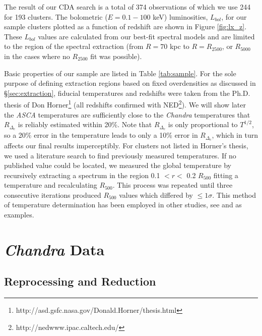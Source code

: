 \documentclass{emulateapj}
\begin{document}
The result of our CDA search is a total of 374 observations of which
we use 244 for 193 clusters. The bolometric ($E = 0.1-100$ keV)
luminosities, $L_{bol}$, for our sample clusters plotted as a function of
redshift are shown in Figure \ref{fig:lx_z}. These $L_{bol}$ values
are calculated from our best-fit spectral models and are limited to
the region of the spectral extraction (from $R=70$ kpc to
$R=R_{2500}$, or $R_{5000}$ in the cases where no $R_{2500}$ fit was
possible).

Basic properties of our sample are listed in Table
\ref{tab:sample}. For the sole purpose of defining extraction regions
based on fixed overdensities as discussed in \S\ref{sec:extraction},
fiducial temperatures and redshifts were taken from the Ph.D. thesis
of Don
Horner\footnote{http://asd.gsfc.nasa.gov/Donald.Horner/thesis.html}
(all redshifts confirmed with NED\footnote{http://nedwww.ipac.caltech.edu/}).
We will show later the {\it ASCA} temperatures are
sufficiently close to the {\it Chandra} temperatures that $R_{\Delta_c}$
is reliably estimated within 20\%. Note that $R_{\Delta_c}$ is only
proportional to $T^{1/2}$, so a 20\% error in the temperature leads to
only a 10\% error in $R_{\Delta_c}$, which in turn affects our final
results imperceptibly. For clusters not listed in Horner's thesis, we
used a literature search to find previously measured temperatures. If
no published value could be located, we measured the global temperature by
recursively extracting a spectrum in the region 0.1 $< r <$ 0.2
$R_{500}$ fitting a temperature and recalculating $R_{500}$. This
process was repeated until three consecutive iterations produced
$R_{500}$ values which differed by $\leq 1\sigma$. This method of
temperature determination has been employed in other studies, see
\cite{2006MNRAS.tmp.1068S} and \cite{2006ApJS..162..304H} as
examples.

\section{{\it Chandra} Data}\label{sec:data}

\subsection{Reprocessing and Reduction}\label{sec:reprocessing}
\end{document}
